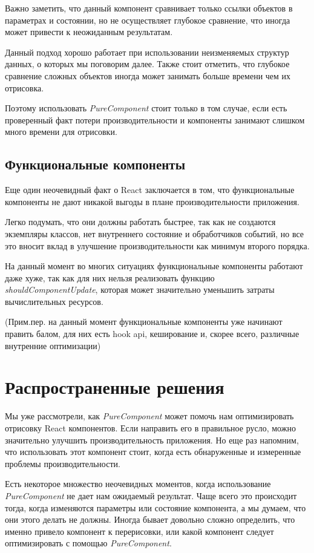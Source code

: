 Важно заметить, что данный компонент сравнивает только ссылки объектов в параметрах и состоянии, но не осуществляет глубокое сравнение, что иногда может привести к неожиданным результатам.

Данный подход хорошо работает при использовании неизменяемых структур данных, о которых мы поговорим далее. Также стоит отметить, что глубокое сравнение сложных объектов иногда может занимать больше времени чем их отрисовка. 

Поэтому использовать \textit{PureComponent} стоит только в том случае, если есть проверенный факт потери производительности и компоненты занимают слишком много времени для отрисовки.

\subsection{Функциональные компоненты}

Еще один неочевидный факт о React заключается в том, что функциональные компоненты не дают никакой выгоды в плане производительности приложения.

Легко подумать, что они должны работать быстрее, так как не создаются экземпляры классов, нет внутреннего состояние и обработчиков событий, но все это вносит вклад в улучшение производительности как минимум второго порядка. 

На данный момент во многих ситуациях функциональные компоненты работают даже хуже, так как для них нельзя реализовать функцию \textit{shouldComponentUpdate}, которая может значительно уменьшить затраты вычислительных ресурсов.

(Прим.пер. на данный момент функциональные компоненты уже начинают править балом, для них есть hook api, кеширование и, скорее всего, различные внутренние оптимизации)

\section{Распространенные решения}

Мы уже рассмотрели, как \textit{PureComponent} может помочь нам оптимизировать отрисовку React компонентов. Если направить его в правильное русло, можно значительно улучшить производительность приложения. Но еще раз напомним, что использовать этот компонент стоит, когда есть обнаруженные и измеренные проблемы производительности.

Есть некоторое множество неочевидных моментов, когда использование \textit{PureComponent} не дает нам ожидаемый результат. Чаще всего это происходит тогда, когда изменяются параметры или состояние компонента, а мы думаем, что они этого делать не должны. Иногда бывает довольно сложно определить, что именно привело компонент к перерисовки, или какой компонент следует оптимизировать с помощью \textit{PureComponent}.

